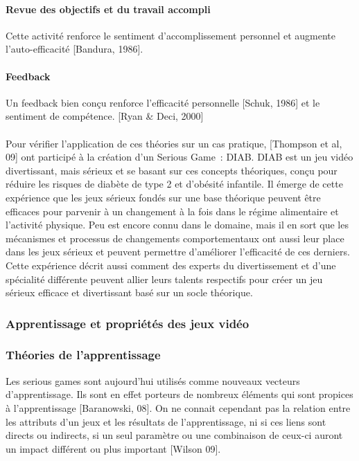 			\paragraph{Revue des objectifs et du travail accompli\\ \quad}
Cette activité renforce le sentiment d’accomplissement personnel et augmente l’auto-efficacité [Bandura, 1986].
			\paragraph{Feedback \\ \quad}
Un feedback bien conçu renforce l’efficacité personnelle [Schuk, 1986] et le sentiment de compétence. [Ryan \& Deci, 2000]
			
\paragraph{}
Pour vérifier l'application de ces théories sur un cas pratique, [Thompson et al, 09] ont participé à la création d'un Serious Game~: DIAB. DIAB est un jeu vidéo divertissant, mais sérieux et se basant sur ces concepts théoriques, conçu pour réduire les risques de diabète de type 2 et d’obésité infantile. Il émerge de cette expérience que les jeux sérieux fondés sur une base théorique peuvent être efficaces pour parvenir à un changement à la fois dans le régime alimentaire et l’activité physique. Peu est encore connu dans le domaine, mais il en sort que les mécanismes et processus de changements comportementaux ont aussi leur place dans les jeux sérieux et peuvent permettre d'améliorer l'efficacité de ces derniers. Cette expérience décrit aussi comment des experts du divertissement et d'une spécialité différente peuvent allier leurs talents respectifs pour créer un jeu sérieux efficace et divertissant basé sur un socle théorique. 
	\subsubsection{Apprentissage et propriétés des jeux vidéo}
			\subsubsection*{Théories de l'apprentissage}
Les serious games sont aujourd'hui utilisés comme nouveaux vecteurs d'apprentissage. Ils sont en effet porteurs de nombreux éléments qui sont propices à l'apprentissage [Baranowski, 08]. On ne connait cependant pas la relation entre les attributs d'un jeux et les résultats de l'apprentissage, ni si ces liens sont directs ou indirects, si un seul paramètre ou une combinaison de ceux-ci auront un impact différent ou plus important [Wilson 09]. 

